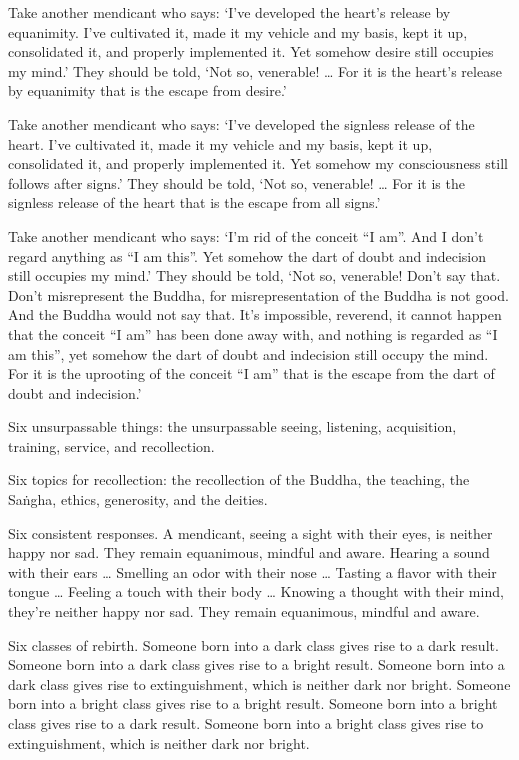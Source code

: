 \documentclass[12pt,openany]{book}%
\begin{document}
Take another mendicant who says: ‘I’ve developed the heart’s release by equanimity. I’ve cultivated it, made it my vehicle and my basis, kept it up, consolidated it, and properly implemented it. Yet somehow desire still occupies my mind.’ They should be told, ‘Not so, venerable! … For it is the heart’s release by equanimity that is the escape from desire.’ 

Take another mendicant who says: ‘I’ve developed the signless release of the heart. I’ve cultivated it, made it my vehicle and my basis, kept it up, consolidated it, and properly implemented it. Yet somehow my consciousness still follows after signs.’ They should be told, ‘Not so, venerable! … For it is the signless release of the heart that is the escape from all signs.’ 

Take another mendicant who says: ‘I’m rid of the conceit “I am”. And I don’t regard anything as “I am this”. Yet somehow the dart of doubt and indecision still occupies my mind.’ They should be told, ‘Not so, venerable! Don’t say that. Don’t misrepresent the Buddha, for misrepresentation of the Buddha is not good. And the Buddha would not say that. It’s impossible, reverend, it cannot happen that the conceit “I am” has been done away with, and nothing is regarded as “I am this”, yet somehow the dart of doubt and indecision still occupy the mind. For it is the uprooting of the conceit “I am” that is the escape from the dart of doubt and indecision.’ 

Six unsurpassable things: the unsurpassable seeing, listening, acquisition, training, service, and recollection. 

Six topics for recollection: the recollection of the Buddha, the teaching, the \textsanskrit{Saṅgha}, ethics, generosity, and the deities. 

Six consistent responses. A mendicant, seeing a sight with their eyes, is neither happy nor sad. They remain equanimous, mindful and aware. Hearing a sound with their ears … Smelling an odor with their nose … Tasting a flavor with their tongue … Feeling a touch with their body … Knowing a thought with their mind, they’re neither happy nor sad. They remain equanimous, mindful and aware. 

Six classes of rebirth. Someone born into a dark class gives rise to a dark result. Someone born into a dark class gives rise to a bright result. Someone born into a dark class gives rise to extinguishment, which is neither dark nor bright. Someone born into a bright class gives rise to a bright result. Someone born into a bright class gives rise to a dark result. Someone born into a bright class gives rise to extinguishment, which is neither dark nor bright. 
\end{document}
